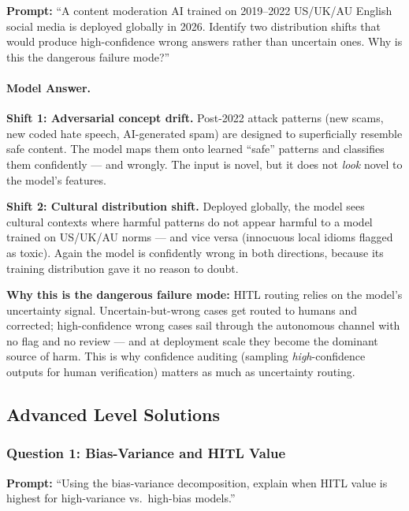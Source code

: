 \textbf{Prompt:} ``A content moderation AI trained on 2019--2022 US/UK/AU English social media is deployed globally in 2026. Identify two distribution shifts that would produce high-confidence wrong answers rather than uncertain ones. Why is this the dangerous failure mode?''

\paragraph{Model Answer.}

\textbf{Shift 1: Adversarial concept drift.} Post-2022 attack patterns (new scams, new coded hate speech, AI-generated spam) are designed to superficially resemble safe content. The model maps them onto learned ``safe'' patterns and classifies them confidently --- and wrongly. The input is novel, but it does not \emph{look} novel to the model's features.

\textbf{Shift 2: Cultural distribution shift.} Deployed globally, the model sees cultural contexts where harmful patterns do not appear harmful to a model trained on US/UK/AU norms --- and vice versa (innocuous local idioms flagged as toxic). Again the model is confidently wrong in both directions, because its training distribution gave it no reason to doubt.

\textbf{Why this is the dangerous failure mode:} HITL routing relies on the model's uncertainty signal. Uncertain-but-wrong cases get routed to humans and corrected; high-confidence wrong cases sail through the autonomous channel with no flag and no review --- and at deployment scale they become the dominant source of harm. This is why confidence auditing (sampling \emph{high}-confidence outputs for human verification) matters as much as uncertainty routing.

\subsection{Advanced Level Solutions}

\subsubsection{Question 1: Bias-Variance and HITL Value}

\textbf{Prompt:} ``Using the bias-variance decomposition, explain when HITL value is highest for high-variance vs.\ high-bias models.''

